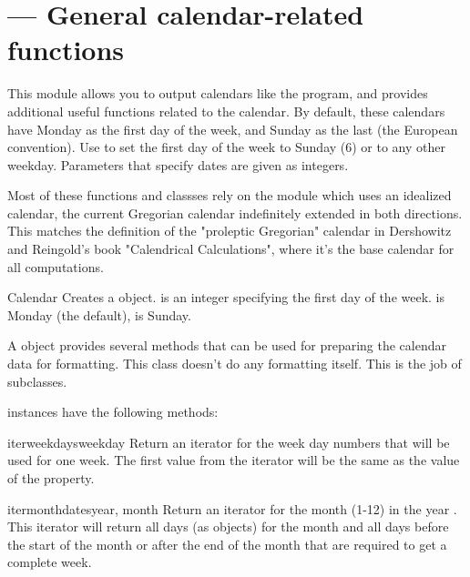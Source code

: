 \section{ ---
         General calendar-related functions}


This module allows you to output calendars like the \UNIX{}
 program, and provides additional useful functions
related to the calendar. By default, these calendars have Monday as
the first day of the week, and Sunday as the last (the European
convention). Use  to set the first day of the
week to Sunday (6) or to any other weekday.  Parameters that specify
dates are given as integers.

Most of these functions and classses rely on the 
module which uses an idealized calendar, the current Gregorian
calendar indefinitely extended in both directions.  This matches
the definition of the "proleptic Gregorian" calendar in Dershowitz
and Reingold's book "Calendrical Calculations", where it's the
base calendar for all computations.

\begin{classdesc}{Calendar}{}
Creates a  object.  is an integer
specifying the first day of the week.  is Monday (the default),
 is Sunday.

A  object provides several methods that can
be used for preparing the calendar data for formatting. This
class doesn't do any formatting itself. This is the job of
subclasses.
\end{classdesc}

 instances have the following methods:

\begin{methoddesc}{iterweekdays}{weekday}
Return an iterator for the week day numbers that will be used
for one week. The first value from the iterator will be the same
as the value of the  property.
\end{methoddesc}

\begin{methoddesc}{itermonthdates}{year, month}
Return an iterator for the month  (1-12) in the
year . This iterator will return all days (as
 objects) for the month and all days
before the start of the month or after the end of the month
that are required to get a complete week.
\end{methoddesc}

